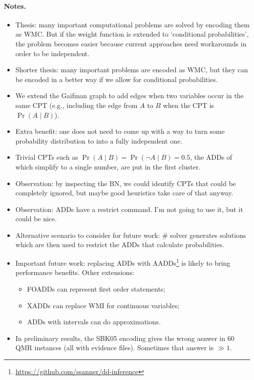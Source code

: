 \documentclass{article}
\theoremstyle{definition}
\theoremstyle{remark}
\begin{document}
\paragraph{Notes.}
\begin{itemize}
\item Thesis: many important computational problems are solved by encoding them
  as WMC. But if the weight function is extended to `conditional probabilities',
  the problem becomes easier because current approaches need workarounds in
  order to be independent.
\item Shorter thesis: many important problems are encoded as WMC, but they can
  be encoded in a better way if we allow for conditional probabilities.
\item We extend the Gaifman graph to add edges when two variables occur in the
  same CPT (e.g., including the edge from $A$ to $B$ when the CPT is $\Pr(A \mid
  B)$).
\item Extra benefit: one does not need to come up with a way to turn some probability
distribution to into a fully independent one.
\item Trivial CPTs such as $\Pr(A \mid B) = \Pr(\neg A \mid B) = 0.5$, the ADDs
  of which simplify to a single number, are put in the first cluster.
\item Observation: by inspecting the BN, we could identify CPTs that could be
  completely ignored, but maybe good heuristics take care of that anyway.
\item Observation: ADDs have a restrict command. I'm not going to use it, but it
  could be nice.
\item Alternative scenario to consider for future work: \#\SAT{} solver
  generates solutions which are then used to restrict the ADDs that calculate
  probabilities.
\item Important future work: replacing ADDs with
  AADDs\footnote{\url{https://github.com/ssanner/dd-inference}} is likely to
  bring performance benefits. Other extensions:
  \begin{itemize}
  \item FOADDs can represent first order statements;
  \item XADDs can replace WMI for continuous variables;
  \item ADDs with intervals can do approximations.
  \end{itemize}
\item In preliminary results, the SBK05 encoding gives the wrong asnwer in 60
  QMR instances (all with evidence files). Sometimes that answer is $\gg 1$.

\end{itemize}
\end{document}
